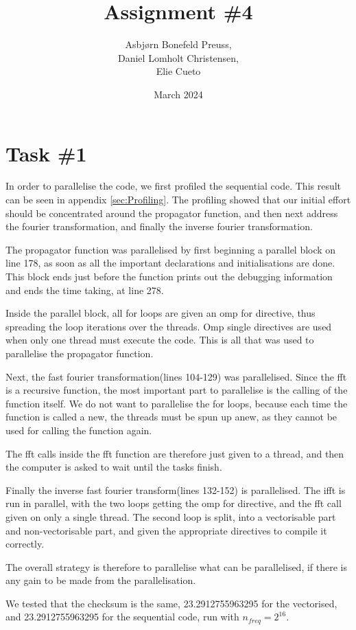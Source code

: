 \documentclass{article}
\title{Assignment \#4}
\author{Asbjørn Bonefeld Preuss,\\ Daniel Lomholt Christensen,\\ Elie Cueto}
\date{March 2024}
\begin{document}
\maketitle
\section{Task \#1}
In order to parallelise the code, we first profiled the sequential code. This result can be seen in appendix \ref{sec:Profiling}. The profiling showed that our initial effort should be concentrated around the propagator function, and then next address the fourier transformation, and finally the inverse fourier transformation.

The propagator function was parallelised by first beginning a parallel block on line 178, as soon as all the important declarations and initialisations are done. This block ends just before the function prints out the debugging information and ends the time taking, at line 278. 

Inside the parallel block, all for loops are given an omp for directive, thus spreading the loop iterations over the threads. Omp single directives are used when only one thread must execute the code. This is all that was used to parallelise the propagator function.

Next, the fast fourier transformation(lines 104-129) was parallelised. Since the fft is a recursive function, the most important part to parallelise is the calling of the function itself. We do not want to parallelise the for loops, because each time the function is called a new, the threads must be spun up anew, as they cannot be used for calling the function again.

The fft calls inside the fft function are therefore just given to a thread, and then the computer is asked to wait until the tasks finish.

Finally the inverse fast fourier transform(lines 132-152) is parallelised. The ifft is run in parallel, with the two loops getting the omp for directive, and the fft call given on only a single thread. The second loop is split, into a vectorisable part and non-vectorisable part, and given the appropriate directives to compile it correctly.

The overall strategy is therefore to parallelise what can be parallelised, if there is any gain to be made from the parallelisation.

We tested that the checksum is the same, 23.2912755963295 for the vectorised, and 23.2912755963295 for the sequential code, run with $n_{freq}=2^{16}$. 
\end{document}
